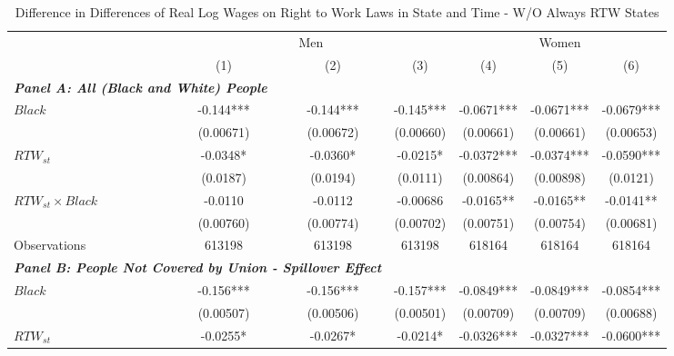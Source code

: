 \begin{table}[ht!]\centering
\def\sym#1{\ifmmode^{#1}\else\(^{#1}\)\fi}
\caption{Difference in Differences of Real Log Wages on Right to Work Laws in State and Time - W/O Always RTW States}\label{tab:wagstagdid-wo-ar2w}
\fontsize{10}{11}\selectfont
\begin{tabular}{l*{6}{c}}
\hline
&\multicolumn{3}{c}{Men}                        &\multicolumn{3}{c}{Women}                      \\\cmidrule(lr){2-4}\cmidrule(lr){5-7}
&\multicolumn{1}{c}{(1)}   &\multicolumn{1}{c}{(2)}   &\multicolumn{1}{c}{(3)}   &\multicolumn{1}{c}{(4)}   &\multicolumn{1}{c}{(5)}   &\multicolumn{1}{c}{(6)}   \\
\hline
\multicolumn{3}{l}{\linebreak \textbf{\textit{Panel A: All (Black and White) People}}} \\
$ Black $           &      -0.144***&      -0.144***&      -0.145***&     -0.0671***&     -0.0671***&     -0.0679***\\
&   (0.00671)   &   (0.00672)   &   (0.00660)   &   (0.00661)   &   (0.00661)   &   (0.00653)   \\
[1em]
$ RTW_{st} $      &     -0.0348*  &     -0.0360*  &     -0.0215*  &     -0.0372***&     -0.0374***&     -0.0590***\\
&    (0.0187)   &    (0.0194)   &    (0.0111)   &   (0.00864)   &   (0.00898)   &    (0.0121)   \\
[1em]
$ RTW_{st} \times Black $&     -0.0110   &     -0.0112   &    -0.00686   &     -0.0165** &     -0.0165** &     -0.0141** \\
&   (0.00760)   &   (0.00774)   &   (0.00702)   &   (0.00751)   &   (0.00754)   &   (0.00681)   \\
\hline
Observations        &      613198   &      613198   &      613198   &      618164   &      618164   &      618164   \\
\hline
\multicolumn{3}{l}{\linebreak \textbf{\textit{Panel B: People Not Covered by Union - Spillover Effect}}} \\
$ Black $           &      -0.156***&      -0.156***&      -0.157***&     -0.0849***&     -0.0849***&     -0.0854***\\
&   (0.00507)   &   (0.00506)   &   (0.00501)   &   (0.00709)   &   (0.00709)   &   (0.00688)   \\
[1em]
$ RTW_{st} $      &     -0.0255*  &     -0.0267*  &     -0.0214*  &     -0.0326***&     -0.0327***&     -0.0600***\\

\end{tabular}
\end{table}
